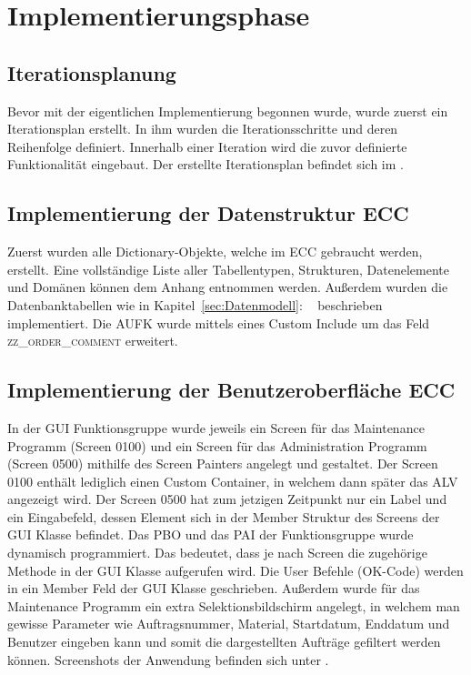\section{Implementierungsphase} 
\label{sec:Implementierungsphase}

\subsection{Iterationsplanung}
\label{sec:Iterationsplanung}
Bevor mit der eigentlichen Implementierung begonnen wurde, wurde zuerst ein Iterationsplan erstellt. In ihm wurden die Iterationsschritte und deren Reihenfolge definiert. Innerhalb einer Iteration wird die zuvor definierte Funktionalität eingebaut. Der erstellte Iterationsplan befindet sich im .

\subsection{Implementierung der Datenstruktur ECC}
\label{sec:Implementierung der Datenstruktur ECC}
Zuerst wurden alle Dictionary-Objekte, welche im \ac{ECC} gebraucht werden, erstellt. Eine vollständige Liste aller Tabellentypen, Strukturen, Datenelemente und Domänen können dem Anhang entnommen werden. Außerdem wurden die Datenbanktabellen wie in Kapitel~\ref{sec:Datenmodell}: ~ beschrieben implementiert. Die AUFK wurde mittels eines Custom Include um das Feld \textsc{zz\_order\_comment} erweitert.

\subsection{Implementierung der Benutzeroberfläche ECC}
\label{sec:Implementierung der Benutzeroberfläche ECC}
In der \ac{GUI} Funktionsgruppe wurde jeweils ein Screen für das Maintenance Programm (Screen 0100) und ein Screen für das Administration Programm (Screen 0500) mithilfe des Screen Painters angelegt und gestaltet. Der Screen 0100 enthält lediglich einen Custom Container, in welchem dann später das \ac{ALV} angezeigt wird. Der Screen 0500 hat zum jetzigen Zeitpunkt nur ein Label und ein Eingabefeld, dessen Element sich in der Member Struktur des Screens der \ac{GUI} Klasse befindet. Das \ac{PBO} und das \ac{PAI} der Funktionsgruppe wurde dynamisch programmiert. Das bedeutet, dass je nach Screen die zugehörige Methode in der \ac{GUI} Klasse aufgerufen wird. Die User Befehle (OK-Code) werden in ein Member Feld der \ac{GUI} Klasse geschrieben. Außerdem wurde für das Maintenance Programm ein extra Selektionsbildschirm angelegt, in welchem man gewisse Parameter wie Auftragsnummer, Material, Startdatum, Enddatum und Benutzer eingeben kann und somit die dargestellten Aufträge gefiltert werden können. Screenshots der Anwendung befinden sich unter .

